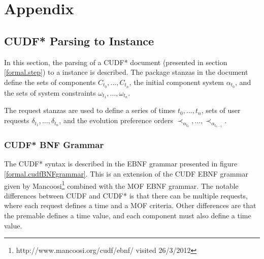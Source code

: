 \chapter{Appendix}

\section{CUDF* Parsing to \modelname Instance}
\label{apx.cudf}
In this section, the parsing of a CUDF* document (presented in section \ref{formal.step}) to a \modelname instance is described.
The package stanzas in the document define the sets of components $C_{t_0},\ldots,C_{t_n}$, the initial component system $\alpha_{t_0}$, 
and the sets of system constraints $\omega_{t_1},\ldots,\omega_{t_n}$.

The request stanzas are used to define a series of times $t_0,\ldots,t_n$, sets of user requests $\delta_{t_1},\ldots,\delta_{t_n}$,
and the evolution preference orders $\prec_{\alpha_{t_0}},\ldots, \prec_{\alpha_{t_{n-1}}}$.

\subsection{CUDF* BNF Grammar}
The CUDF* syntax is described in the EBNF grammar presented in figure \ref{formal.cudfBNFgrammar}.
This is an extension of the CUDF EBNF grammar given by Mancoosi\footnote{http://www.mancoosi.org/cudf/ebnf/ visited 26/3/2012}
combined with the MOF EBNF grammar.
The notable differences between CUDF and CUDF* is that there can be multiple requests, where each request defines a time and a MOF criteria.
Other differences are that the premable defines a time value,  
and each component must also define a time value.

